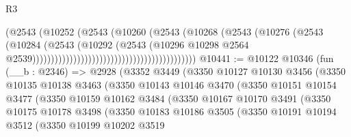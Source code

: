 \begin{lexlean}{R3}
\begin{coremodule}
                                                                (@2543
                                                                  (@10252
                                                                    (@2543
                                                                      (@10260
                                                                        (@2543
                                                                          (@10268
                                                                            (@2543
                                                                              (@10276
                                                                                (@2543
                                                                                  (@10284
                                                                                    (@2543
                                                                                      (@10292
                                                                                        (@2543
                                                                                          (@10296
                                                                                            @10298
                                                                                            @2564
                                                                                            @2539))))))))))))))))))))))))))))))))))))))))))))
@10441 := @10122
    @10346
    (fun (__b : @2346) =>
    @2928
      (@3352
        @3449
        (@3350
          @10127
          @10130
          @3456
          (@3350
            @10135
            @10138
            @3463
            (@3350
              @10143
              @10146
              @3470
              (@3350
                @10151
                @10154
                @3477
                (@3350
                  @10159
                  @10162
                  @3484
                  (@3350
                    @10167
                    @10170
                    @3491
                    (@3350
                      @10175
                      @10178
                      @3498
                      (@3350
                        @10183
                        @10186
                        @3505
                        (@3350
                          @10191
                          @10194
                          @3512
                          (@3350
                            @10199
                            @10202
                            @3519

\end{coremodule}
\end{lexlean}
